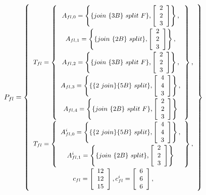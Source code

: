 \begin{displaymath} \small
P_{fl} = \left\{
\begin{array}{c}
T_{fl} = \left\{
\begin{array}{c}
A_{fl,0} = \left\{ \{join\ \{3B\}\ split\ F\}, \left[\begin{array}{c} 2 \\ 2 \\ 3 \end{array}\right]\right\}, \\
A_{fl,1} = \left\{ \{join\ \{2B\}\ split\}, \left[\begin{array}{c} 2 \\ 2 \\ 3 \end{array}\right]\right\}, \\
A_{fl,2} = \left\{ \{join\ \{3B\}\ split\ F\}, \left[\begin{array}{c} 2 \\ 2 \\ 3 \end{array}\right]\right\}, \\
A_{fl,3} = \left\{ \{\{2\ join\}\{5B\}\ split\}, \left[\begin{array}{c} 4 \\ 4 \\ 3 \end{array}\right]\right\}, \\
A_{fl,4} = \left\{ \{join\ \{2B\}\ split\ F\}, \left[\begin{array}{c} 2 \\ 2 \\ 3 \end{array}\right]\right\} \\
\end{array}\right\}, \\
T_{fl} = \left\{
\begin{array}{c}
A^i_{fl,0} = \left\{ \{\{2\ join\}\{5B\}\ split\}, \left[\begin{array}{c} 4 \\ 4 \\ 3 \end{array}\right]\right\}, \\
A^i_{fl,1} = \left\{ \{join\ \{2B\}\ split\}, \left[\begin{array}{c} 2 \\ 2 \\ 3 \end{array}\right]\right\} \\
\end{array}\right\}, \\
c_{fl} = \left[ \begin{array}{c} 12 \\ 12 \\ 15 \end{array}
\right], c^i_{fl} = \left[ \begin{array}{c} 6 \\ 6 \\ 6
\end{array} \right],
\end{array}
\right\}
\end{displaymath}
